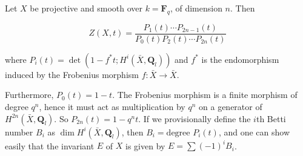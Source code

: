 Let $X$ be projective and smooth over $k = \mathbf{F}_q$, of dimension $n$. Then

$$Z(X,t) = \frac{P_1(t) \cdots P_{2n-1}(t)}{P_0(t) P_2(t) \cdots P_{2n}(t)}$$

where $P_i(t) = \det(1 - f^* t; H^i(\bar{X}, \mathbf{Q}_l))$ and $f^*$ is the endomorphism induced by the Frobenius morphism $f: \bar{X} \rightarrow \bar{X}$.

Furthermore, $P_0(t) = 1 - t$. The Frobenius morphism is a finite morphism of degree $q^n$, hence it must act as multiplication by $q^n$ on a generator of $H^{2n}(\bar{X}, \mathbf{Q}_l)$. So $P_{2n}(t) = 1 - q^n t$. If we provisionally define the $i$th Betti number $B_i$ as $\dim H^i(\bar{X}, \mathbf{Q}_l)$, then $B_i = \text{degree } P_i(t)$, and one can show easily that the invariant $E$ of $X$ is given by $E = \sum (-1)^i B_i$.